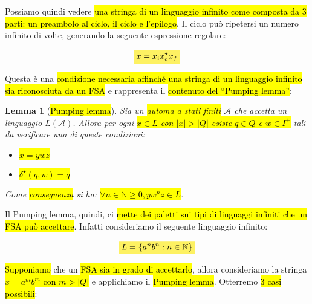 \documentclass[a4paper,11pt,oneside]{article}
\theoremstyle{plain}
\newtheorem{lem}{Lemma}[section]
\theoremstyle{definition}
\theoremstyle{remark}
\newcommand{\mhl}[1]{\colorbox{hlcolor}{$\displaystyle #1$}}
\begin{document}
Possiamo quindi vedere \hl{una stringa di un linguaggio infinito come composta
da 3 parti: un preambolo al ciclo, il ciclo e l'epilogo}. Il ciclo può ripetersi
un numero infinito di volte, generando la seguente espressione regolare:

\begin{equation}
  \mhl{x = x_i x_c^\star x_f}
\end{equation}

Questa è una \hl{condizione necessaria affinché una stringa di un linguaggio
infinito sia riconosciuta da un FSA} e rappresenta il \hl{contenuto del
``Pumping lemma''}:

\begin{lem}[\hl{Pumping lemma}]\label{thm:pumping-lemma}
  Sia un \hl{automa a stati finiti} $\mathcal{A}$ che accetta un linguaggio
  $L(\mathcal{A})$. Allora per ogni \hl{$x \in L$ con $|x| > |Q|$ esiste $q \in
  Q$ e $w \in I^+$} tali da verificare una di queste condizioni:

  \begin{itemize}
    \item \hl{$x = ywz$}
    \item \hl{$\delta^\star(q,w) = q$}
  \end{itemize}

  Come \hl{conseguenza} si ha: \hl{$\forall n \in \mathbb{N} \geq 0, y w^n z \in
  L$}.
\end{lem}

Il Pumping lemma, quindi, ci \hl{mette dei paletti sui tipi di linguaggi
infiniti che un FSA può accettare}. Infatti consideriamo il seguente linguaggio
infinito:

\begin{equation}
  \mhl{L = \{ a^n b^n : n \in \mathbb{N} \}}
\end{equation}

\hl{Supponiamo} che un \hl{FSA sia in grado di accettarlo}, allora consideriamo
la stringa \hl{$x = a^m b^m$ con $m > |Q|$} e applichiamo il \hl{Pumping lemma}.
Otterremo \hl{3 casi possibili}:
\end{document}
